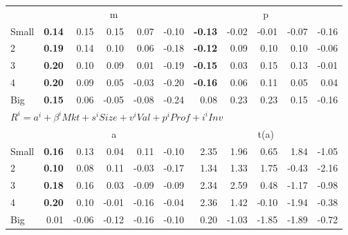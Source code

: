 \begin{tabular}{lrrrrrrrrrr}
  
     & \multicolumn{5}{c}{m} & \multicolumn{5}{c}{p}   \\
     \cmidrule(r){2-6} \cmidrule(r){7-11} 
    Small  & \textbf{0.14}  & 0.15  & 0.15  & 0.07  & -0.10             & \textbf{-0.13}  & -0.02  & -0.01  & -0.07  & -0.16   \\
    2      & \textbf{0.19}  & 0.14  & 0.10  & 0.06  & -0.18             & \textbf{-0.12}  & 0.09  & 0.10  & 0.10  & -0.06   \\
    3      & \textbf{0.20}  & 0.10  & 0.09  & 0.01  & -0.19             & \textbf{-0.15}  & 0.03  & 0.15  & 0.13  & -0.01   \\
    4      & \textbf{0.20}  & 0.09  & 0.05  & -0.03  & -0.20            & \textbf{-0.16}  & 0.06  & 0.11  & 0.05  & 0.04   \\
    Big    & \textbf{0.15}  & 0.06  & -0.05  & -0.08  & -0.24           & 0.08  & 0.23  & 0.23  & 0.15  & -0.16   \\
    
  
    

  \midrule
  \multicolumn{11}{l}{$R^i=a^i+\beta^iMkt+s^iSize+v^iVal+p^iProf+i^iInv$}  \\
  
     & \multicolumn{5}{c}{a} & \multicolumn{5}{c}{t(a)}   \\
     \cmidrule(r){2-6} \cmidrule(r){7-11} 
    Small  & \textbf{0.16}  & 0.13  & 0.04  & 0.11  & -0.10  & 2.35  & 1.96  & 0.65  & 1.84  & -1.05   \\
    2  & \textbf{0.10}  & 0.08  & 0.11  & -0.03  & -0.17  & 1.34  & 1.33  & 1.75  & -0.43  & -2.16   \\
    3  & \textbf{0.18}  & 0.16  & 0.03  & -0.09  & -0.09  & 2.34  & 2.59  & 0.48  & -1.17  & -0.98   \\
    4  & \textbf{0.20}  & 0.10  & -0.01  & -0.16  & -0.04  & 2.36  & 1.42  & -0.10  & -1.94  & -0.38   \\
    Big  & 0.01  & -0.06  & -0.12  & -0.16  & -0.10  & 0.20  & -1.03  & -1.85  & -1.89  & -0.72   \\

  \bottomrule
\end{tabular}
